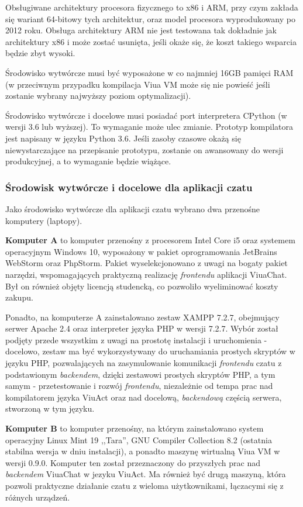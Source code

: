 \documentclass[11pt,oneside,a4paper,titlepage,onecolumn]{article}
\begin{document}
Obsługiwane architektury procesora fizycznego to x86 i ARM, przy czym zakłada się wariant 64-bitowy tych
architektur, oraz model procesora wyprodukowany po 2012 roku. Obsługa architektury ARM nie jest testowana tak
dokładnie jak architektury x86 i może zostać usunięta, jeśli okaże się, że koszt takiego wsparcia będzie zbyt
wysoki.

Środowisko wytwórcze musi być wyposażone w co najmniej 16GB pamięci RAM (w przeciwnym przypadku kompilacja
Viua VM może się nie powieść jeśli zostanie wybrany najwyższy poziom optymalizacji).

Środowisko wytwórcze i docelowe musi posiadać port interpretera CPython (w wersji 3.6 lub wyższej). To
wymaganie może ulec zmianie. Prototyp kompilatora jest napisany w języku Python 3.6. Jeśli zasoby czasowe
okażą się niewystarczające na przepisanie prototypu, zostanie on awansowany do wersji produkcyjnej, a to
wymaganie będzie wiążące.

\subsubsection{Środowisk wytwórcze i docelowe dla aplikacji czatu}

Jako środowisko wytwórcze dla aplikacji czatu wybrano dwa przenośne komputery (laptopy).

\textbf{Komputer A} to komputer przenośny z procesorem Intel Core i5 oraz systemem operacyjnym Windows 10,
wyposażony w pakiet oprogramowania JetBrains WebStorm oraz PhpStorm. Pakiet wyselekcjonowano z uwagi
na bogaty pakiet narzędzi, wspomagających praktyczną realizację \textit{frontendu} aplikacji ViuaChat.
Był on również objęty licencją studencką, co pozwoliło wyeliminować koszty zakupu.

Ponadto, na komputerze A zainstalowano zestaw XAMPP 7.2.7, obejmujący serwer Apache 2.4 oraz interpreter 
języka PHP w wersji 7.2.7. Wybór został podjęty przede wszystkim z uwagi na prostotę instalacji i
uruchomienia - docelowo, zestaw ma być wykorzystywany do uruchamiania prostych skryptów w języku
PHP, pozwalających na zasymulowanie komunikacji \textit{frontendu} czatu z podstawionym \textit{backendem},
dzięki zestawowi prostych skryptów PHP, a tym samym - przetestowanie i rozwój \textit{frontendu}, 
niezależnie od tempa prac nad kompilatorem języka ViuAct oraz nad docelową, \textit{backendową} częścią 
serwera, stworzoną w tym języku.

\textbf{Komputer B} to komputer przenośny, na którym zainstalowano system operacyjny Linux Mint 19 
,,Tara'', GNU Compiler Collection 8.2 (ostatnia stabilna wersja w dniu instalacji), a ponadto maszynę
wirtualną Viua VM w wersji 0.9.0. Komputer ten został przeznaczony do przyszłych prac nad 
\textit{backendem} ViuaChat w jezyku ViuAct. Ma również być drugą maszyną, która pozwoli praktyczne
działanie czatu z wieloma użytkownikami, łączacymi się z różnych urządzeń.
\end{document}
